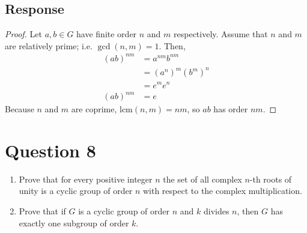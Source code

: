 \documentclass[13pt]{article}
\begin{document}
\subsection*{Response}
\begin{proof}
    Let $a, b \in G$ have finite order $n$ and $m$ respectively. Assume that $n$ and $m$ are
    relatively prime; i.e. $\gcd(n, m) = 1$. Then,
    \begin{align*}
        (ab)^{nm} &= a^{nm}b^{nm} \\
                  &= \left(a^n\right)^m \left(b^m\right)^n \\
                  &= e^m e^n \\
        (ab)^{nm} &= e
    \end{align*}
    Because $n$ and $m$ are coprime, $\text{lcm}(n, m) = nm$, so $ab$ has order $nm$.
\end{proof}





\newpage
\section*{Question 8}
\begin{enumerate}[label=(\alph*)]
\item Prove that for every positive integer $n$ the set of all complex $n$-th roots of unity is a
  cyclic group of order $n$ with respect to the complex multiplication.
\item Prove that if $G$ is a cyclic group of order $n$ and $k$ divides $n$, then $G$ has exactly one
  subgroup of order $k$.
\end{enumerate}
\end{document}
